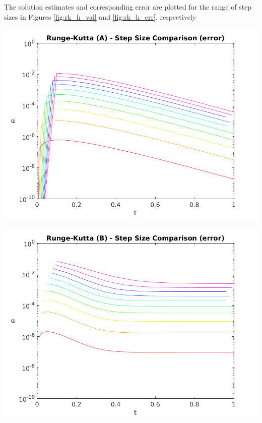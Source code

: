 \documentclass{article}
\begin{document}
The solution estimates and corresponding error are plotted for the range of step sizes in Figures \ref{fig:rk_h_val} and \ref{fig:rk_h_err}, respectively
\begin{center}
	\centering
    \begin{minipage}{0.5\textwidth}
        \centering
	    \includegraphics[width=1\textwidth]{../output/a_rk_h_err.png}
    \end{minipage}\hfill
    \begin{minipage}{0.5\textwidth}
        \centering
	    \includegraphics[width=1\textwidth]{../output/b_rk_h_err.png}
    \end{minipage}
 	\label{fig:rk_h_err}
\end{center}
\end{document}
